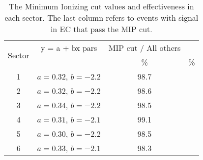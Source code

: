 \begin{table}[ht]
    \label{tab:EoEi}
    \begin{center}
        \begin{tabular}{c | c | c | c}
            \hline
            \multirow{2}{*}{Sector}
            & y = a + bx pars & MIP cut / All others \\
            & & \% & \% \\
            \hline
            1 & $a=0.32$, $b=-2.2$ & 98.7 \\
            2 & $a=0.32$, $b=-2.2$ & 98.6 \\
            3 & $a=0.34$, $b=-2.2$ & 98.5 \\
            4 & $a=0.31$, $b=-2.1$ & 99.1 \\
            5 & $a=0.30$, $b=-2.2$ & 98.5 \\
            6 & $a=0.33$, $b=-2.1$ & 98.3 \\
            \hline
        \end{tabular}
        \caption{The Minimum Ionizing cut values and effectiveness in each sector.
        The last column refers to events with signal in EC that pass the MIP cut.}
    \end{center}
\end{table}



